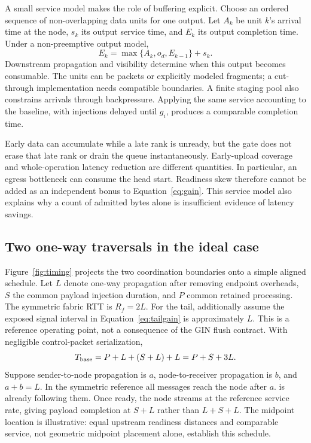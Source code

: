 A small service model makes the role of buffering explicit. Choose an ordered sequence of non-overlapping data units for one output. Let $A_k$ be unit $k$'s arrival time at the \sys{} node, $s_k$ its output service time, and $E_k$ its output completion time. Under a non-preemptive output model,
\begin{equation}
 E_k=\max\{A_k,o_d,E_{k-1}\}+s_k.
 \label{eq:queue}
\end{equation}
Downstream propagation and visibility determine when this output becomes consumable. The units can be packets or explicitly modeled fragments; a cut-through implementation needs compatible boundaries. A finite staging pool also constrains arrivals through backpressure. Applying the same service accounting to the baseline, with injections delayed until $g_i$, produces a comparable completion time.

Early data can accumulate while a late rank is unready, but the gate does not erase that late rank or drain the queue instantaneously. Early-upload coverage and whole-operation latency reduction are different quantities. In particular, an egress bottleneck can consume the head start. Readiness skew therefore cannot be added as an independent bonus to Equation~\eqref{eq:gain}. This service model also explains why a count of admitted bytes alone is insufficient evidence of latency savings.

\subsection{Two one-way traversals in the ideal case}
\label{sec:ideal}
Figure~\ref{fig:timing} projects the two coordination boundaries onto a simple aligned schedule. Let $L$ denote one-way propagation after removing endpoint overheads, $S$ the common payload injection duration, and $P$ common retained processing. The symmetric fabric RTT is $R_f=2L$. For the tail, additionally assume the exposed signal interval in Equation~\eqref{eq:tailgain} is approximately $L$. This is a reference operating point, not a consequence of the GIN flush contract. With negligible control-packet serialization,
\begin{equation}
 T_{\rm base}=P+L+(S+L)+L=P+S+3L.
 \label{eq:base}
\end{equation}
Suppose sender-to-node propagation is $a$, node-to-receiver propagation is $b$, and $a+b=L$. In the symmetric reference all \ready{} messages reach the \sys{} node after $a$. \data{} is already following them. Once ready, the node streams at the reference service rate, giving payload completion at $S+L$ rather than $L+S+L$. The midpoint location is illustrative: equal upstream readiness distances and comparable service, not geometric midpoint placement alone, establish this schedule.

